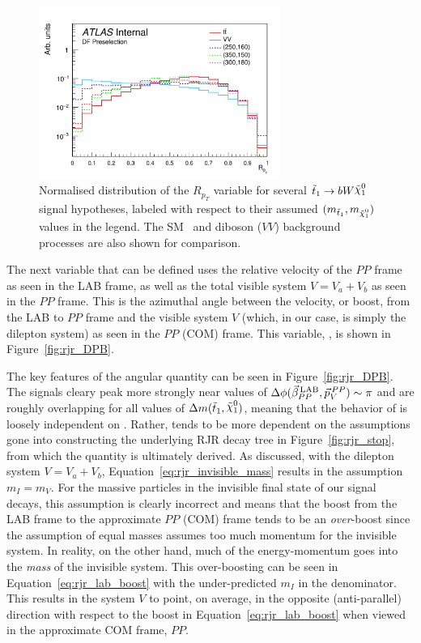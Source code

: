 \begin{figure}[!htb]
    \begin{center}
        \includegraphics[width=0.7\textwidth]{figures/search_stop2l/strategy/comp_plots/dfpresel_RPT}
        \caption{
            Normalised distribution of the $R_{p_T}$ variable for several $\stopone \rightarrow b W \ninoone$
            signal hypotheses, labeled with respect to their assumed $(m_{\stopone}, m_{\ninoone})$ values in the
            legend.
            The SM \ttbar~and diboson ($VV$) background processes are also shown for comparison.
        }
        \label{fig:rjr_RPT}
    \end{center}
\end{figure}

The next variable that can be defined uses the relative velocity of the $PP$ frame as seen
in the LAB frame, as well as the total visible system $V = V_a + V_b$ as seen in the $PP$ frame.
This is the azimuthal angle between the velocity, or boost, from the LAB to $PP$ frame and the visible
system $V$ (which, in our case, is simply the dilepton system) as seen in the $PP$ (COM) frame.
This variable, \dpb, is shown in Figure~\ref{fig:rjr_DPB}.

The key features of the angular quantity \dpb can be seen in Figure~\ref{fig:rjr_DPB}.
The \stopone signals cleary peak more strongly near values of $\Delta \phi (\vec{\beta}_{PP}^{\,\text{LAB}}, \vec{p}_V^{\,PP}) \sim \pi$ and are roughly
overlapping for all values of $\sdiff$, meaning that the behavior of \dpb is loosely
independent on \sdiff.
Rather, \dpb tends to be more dependent on the assumptions gone into constructing the underlying
RJR decay tree in Figure~\ref{fig:rjr_stop}, from which the quantity \dpb is ultimately derived.
As discussed, with the dilepton system $V = V_a + V_b$, Equation~\ref{eq:rjr_invisible_mass} results
in the assumption $m_I = m_V$.
For the massive \ninoone particles in the invisible final state of our \stopone signal decays, this
assumption is clearly incorrect and means that the boost from the LAB frame to the approximate 
$PP$ (COM) frame tends to be an \textit{over}-boost since the assumption of equal masses assumes
too much momentum for the invisible system.
In reality, on the other hand, much of the \stopone energy-momentum goes
into the \textit{mass} of the invisible system.
This over-boosting can be seen in Equation~\ref{eq:rjr_lab_boost} with the under-predicted $m_I$
in the denominator.
This results in the system $V$ to point, on average, in the opposite (anti-parallel) direction with
respect to the boost in Equation~\ref{eq:rjr_lab_boost} when viewed in the approximate COM frame, $PP$.

